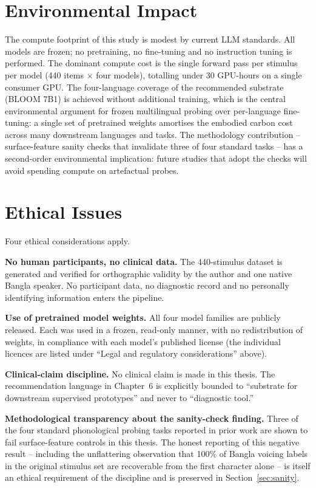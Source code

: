 \section{Environmental Impact}

The compute footprint of this study is modest by current LLM standards. All models are frozen; no pretraining, no fine-tuning and no instruction tuning is performed. The dominant compute cost is the single forward pass per stimulus per model (440 items $\times$ four models), totalling under 30 GPU-hours on a single consumer GPU. The four-language coverage of the recommended substrate (BLOOM 7B1) is achieved without additional training, which is the central environmental argument for frozen multilingual probing over per-language fine-tuning: a single set of pretrained weights amortises the embodied carbon cost across many downstream languages and tasks. The methodology contribution -- surface-feature sanity checks that invalidate three of four standard tasks -- has a second-order environmental implication: future studies that adopt the checks will avoid spending compute on artefactual probes.

\section{Ethical Issues}

Four ethical considerations apply.

\textbf{No human participants, no clinical data.} The 440-stimulus dataset is generated and verified for orthographic validity by the author and one native Bangla speaker. No participant data, no diagnostic record and no personally identifying information enters the pipeline.

\textbf{Use of pretrained model weights.} All four model families are publicly released. Each was used in a frozen, read-only manner, with no redistribution of weights, in compliance with each model's published license (the individual licences are listed under ``Legal and regulatory considerations'' above).

\textbf{Clinical-claim discipline.} No clinical claim is made in this thesis. The recommendation language in Chapter~6 is explicitly bounded to ``substrate for downstream supervised prototypes'' and never to ``diagnostic tool.''

\textbf{Methodological transparency about the sanity-check finding.} Three of the four standard phonological probing tasks reported in prior work are shown to fail surface-feature controls in this thesis. The honest reporting of this negative result -- including the unflattering observation that 100\% of Bangla voicing labels in the original stimulus set are recoverable from the first character alone -- is itself an ethical requirement of the discipline and is preserved in Section~\ref{sec:sanity}.

